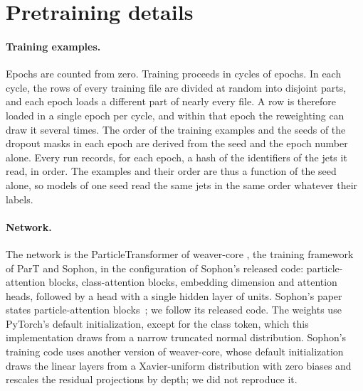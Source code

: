 \documentclass[11pt]{article}
\begin{document}
\clearpage
\appendix
\section{Pretraining details}\label{app:pretrain}

\paragraph{Training examples.} Epochs are counted from zero. Training proceeds in
cycles of \DesignVtwoNWindows{} epochs. In each cycle, the rows of every training file are
divided at random into \DesignVtwoNWindows{} disjoint parts, and each epoch loads a different
part of nearly every file. A row is therefore loaded in a single epoch per cycle, and within
that epoch the reweighting can draw it several times. The order of the training examples and
the seeds of the dropout masks in each epoch are derived from the seed and the epoch number
alone. Every run records, for each epoch, a hash of the identifiers of the jets it read, in
order. The examples and their order are thus a function of the seed alone, so models of one seed
read the same jets in the same order whatever their labels.

\paragraph{Network.} The network is the ParticleTransformer of weaver-core
\DesignWeaverVersion{}, the training framework of ParT and Sophon, in the configuration of Sophon's released code:
\DesignParticleBlocks{} particle-attention blocks, \DesignClassBlocks{} class-attention
blocks, embedding dimension \DesignEmbedDim{} and \DesignHeads{} attention heads, followed
by a head with a single hidden layer of \DesignHeadHidden{} units. Sophon's paper states
\LitSophonPaperParticleBlocks{} particle-attention blocks~\cite[App.~B.1]{sophon}; we
follow its released code. The weights use PyTorch's default initialization, except for the
class token, which this implementation draws from a narrow truncated normal distribution.
Sophon's training code uses another version of weaver-core, whose default initialization
draws the linear layers from a Xavier-uniform distribution with zero biases and rescales the
residual projections by depth; we did not reproduce it.
\end{document}
